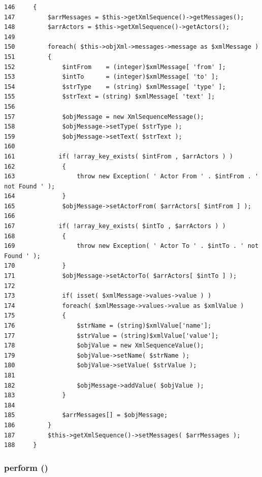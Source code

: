 \begin{Code}\begin{verbatim}146     {
147         $arrMessages = $this->getXmlSequence()->getMessages();
148         $arrActors = $this->getXmlSequence()->getActors();
149         
150         foreach( $this->objXml->messages->message as $xmlMessage )
151         {
152             $intFrom    = (integer)$xmlMessage[ 'from' ];
153             $intTo      = (integer)$xmlMessage[ 'to' ];
154             $strType    = (string) $xmlMessage[ 'type' ];
155             $strText = (string) $xmlMessage[ 'text' ];
156 
157             $objMessage = new XmlSequenceMessage();
158             $objMessage->setType( $strType );
159             $objMessage->setText( $strText );
160 
161            if( !array_key_exists( $intFrom , $arrActors ) )
162             {
163                 throw new Exception( ' Actor From ' . $intFrom . ' not Found ' );
164             }
165             $objMessage->setActorFrom( $arrActors[ $intFrom ] );
166 
167            if( !array_key_exists( $intTo , $arrActors ) )
168             {
169                 throw new Exception( ' Actor To ' . $intTo . ' not Found ' );
170             }
171             $objMessage->setActorTo( $arrActors[ $intTo ] );
172 
173             if( isset( $xmlMessage->values->value ) )
174             foreach( $xmlMessage->values->value as $xmlValue )
175             {
176                 $strName = (string)$xmlValue['name'];
177                 $strValue = (string)$xmlValue['value'];
178                 $objValue = new XmlSequenceValue();
179                 $objValue->setName( $strName );
180                 $objValue->setValue( $strValue );
181 
182                 $objMessage->addValue( $objValue );
183             }
184 
185             $arrMessages[] = $objMessage;
186         }
187         $this->getXmlSequence()->setMessages( $arrMessages );
188     }
\end{verbatim}
\end{Code}


\hypertarget{class_xml_sequence_factory_xml_469121070b5e6118f202517380558019}{
\subsubsection[{perform}]{\setlength{\rightskip}{0pt plus 5cm}perform ()}}
\label{class_xml_sequence_factory_xml_469121070b5e6118f202517380558019}


